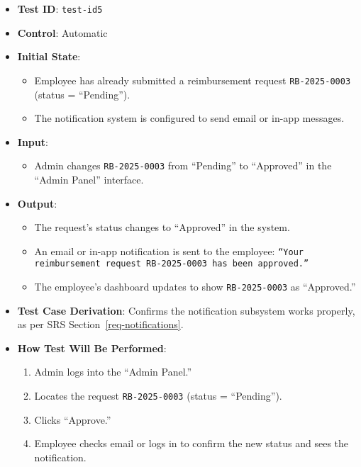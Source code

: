 \documentclass[12pt, titlepage]{article}
\begin{document}
\begin{itemize}
    \item \textbf{Test ID}: \texttt{test-id5}
    \item \textbf{Control}: Automatic
    \item \textbf{Initial State}:
    \begin{itemize}
        \item Employee has already submitted a reimbursement request \texttt{RB-2025-0003} (status = ``Pending'').
        \item The notification system is configured to send email or in-app messages.
    \end{itemize}
    \item \textbf{Input}:
    \begin{itemize}
        \item Admin changes \texttt{RB-2025-0003} from ``Pending'' to ``Approved'' in the ``Admin Panel'' interface.
    \end{itemize}
    \item \textbf{Output}:
    \begin{itemize}
        \item The request's status changes to ``Approved'' in the system.
        \item An email or in-app notification is sent to the employee: 
        \texttt{``Your reimbursement request RB-2025-0003 has been approved.''}
        \item The employee's dashboard updates to show \texttt{RB-2025-0003} as ``Approved.''
    \end{itemize}
    \item \textbf{Test Case Derivation}:
    Confirms the notification subsystem works properly, as per SRS Section~\ref{req-notifications}.
    \item \textbf{How Test Will Be Performed}:
    \begin{enumerate}
        \item Admin logs into the ``Admin Panel.''
        \item Locates the request \texttt{RB-2025-0003} (status = ``Pending'').
        \item Clicks ``Approve.'' 
        \item Employee checks email or logs in to confirm the new status and sees the notification.
    \end{enumerate}
\end{itemize}
\end{document}
